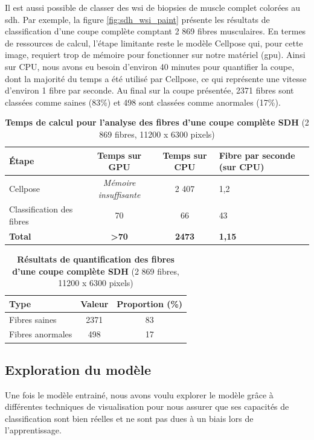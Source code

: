 Il est aussi possible de classer des \gls{wsi} de biopsies de muscle complet colorées au \gls{sdh}. Par exemple, la figure \ref{fig:sdh_wsi_paint} présente les résultats de classification d'une coupe complète comptant 2 869 fibres musculaires. En termes de ressources de calcul, l'étape limitante reste le modèle Cellpose qui, pour cette image, requiert trop de mémoire pour fonctionner sur notre matériel (\gls{gpu}). Ainsi sur CPU, nous avons eu besoin d'environ 40 minutes pour quantifier la coupe, dont la majorité du temps a été utilisé par Cellpose,  ce qui représente une vitesse d'environ 1 fibre par seconde. Au final sur la coupe présentée, 2371 fibres sont classées comme saines (83\%) et 498 sont classées comme anormales (17\%).

\begin{table}[!ht]
\centering
\caption[Temps de calcul pour l'analyse des fibres d'une coupe complète SDH]{\textbf{Temps de calcul pour l'analyse des fibres d'une coupe complète SDH} (2 869 fibres, 11200 x 6300 pixels)}
\label{tab:sdh_wsi_timetable}
\begin{tabularx}{\textwidth}{|l|c|c|X|}
\hline
\textbf{Étape} & \textbf{Temps sur GPU} & \textbf{Temps sur CPU} & \textbf{Fibre par seconde (sur CPU)} \\
\hline
Cellpose & \textit{Mémoire insuffisante} & 2 407 & 1,2 \\
\hline
Classification des fibres & 70 & 66 & 43 \\
\hline
\textbf{Total} & \textbf{>70} & \textbf{2473} & \textbf{1,15} \\
\hline
\end{tabularx}
\end{table}
\begin{table}[!ht]
\centering
\caption[Résultats de quantification des  fibres d'une coupe complète SDH]{\textbf{Résultats de quantification des  fibres d'une coupe complète SDH} (2 869 fibres, 11200 x 6300 pixels)}
\label{tab:sdh_wsi_resultstable}
\begin{tabular}{|l|c|c|}
\hline
\textbf{Type} & \textbf{Valeur} & \textbf{Proportion (\%)} \\
\hline
Fibres saines & 2371 & 83 \\
\hline
Fibres anormales & 498 & 17 \\
\hline
\end{tabular}
\end{table}


\subsection{Exploration du modèle}
Une fois le modèle entrainé, nous avons voulu explorer le modèle grâce à différentes techniques de visualisation pour nous assurer que ses capacités de classification sont bien réelles et ne sont pas dues à un biais lors de l'apprentissage.

